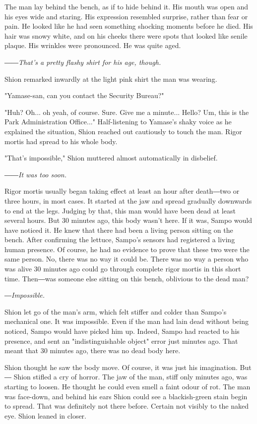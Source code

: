The man lay behind the bench, as if to hide behind it. His mouth was
open and his eyes wide and staring. His expression resembled surprise,
rather than fear or pain. He looked like he had seen something shocking
moments before he died. His hair was snowy white, and on his cheeks
there were spots that looked like senile plaque. His wrinkles were
pronounced. He was quite aged.

\emph{――That's a pretty flashy shirt for his age, though.}

Shion remarked inwardly at the light pink shirt the man was wearing.

"Yamase-san, can you contact the Security Bureau?"

"Huh? Oh... oh yeah, of course. Sure. Give me a minute... Hello? Um,
this is the Park Administration Office..." Half-listening to Yamase's
shaky voice as he explained the situation, Shion reached out cautiously
to touch the man. Rigor mortis had spread to his whole body.

"That's impossible," Shion muttered almost automatically in disbelief.

\emph{――It was too soon.}

Rigor mortis usually began taking effect at least an hour after
death―two or three hours, in most cases. It started at the jaw and
spread gradually downwards to end at the legs. Judging by that, this man
would have been dead at least several hours. But 30 minutes ago, this
body wasn't here. If it was, Sampo would have noticed it. He knew that
there had been a living person sitting on the bench. After confirming
the lettuce, Sampo's sensors had registered a living human presence. Of
course, he had no evidence to prove that these two were the same person.
No, there was no way it could be. There was no way a person who was
alive 30 minutes ago could go through complete rigor mortis in this
short time. Then―was someone else sitting on this bench, oblivious to
the dead man?

\emph{―Impossible.}

Shion let go of the man's arm, which felt stiffer and colder than
Sampo's mechanical one. It was impossible. Even if the man had lain dead
without being noticed, Sampo would have picked him up. Indeed, Sampo had
reacted to his presence, and sent an "indistinguishable object" error
just minutes ago. That meant that 30 minutes ago, there was no dead body
here.

Shion thought he saw the body move. Of course, it was just his
imagination. But ― Shion stifled a cry of horror. The jaw of the man,
stiff only minutes ago, was starting to loosen. He thought he could even
smell a faint odour of rot. The man was face-down, and behind his ears
Shion could see a blackish-green stain begin to spread. That was
definitely not there before. Certain not visibly to the naked eye. Shion
leaned in closer.

